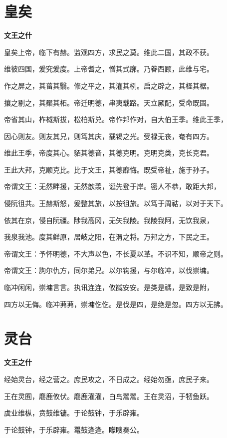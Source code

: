 \documentclass[12pt,a4paper]{ctexbook}
\begin{document}
\section{皇矣}
\textbf{文王之什}\par\vspace{0.5em}
皇矣上帝，临下有赫。监观四方，求民之莫。维此二国，其政不获。\par
维彼四国，爰究爰度。上帝耆之，憎其式廓。乃眷西顾，此维与宅。\par
作之屏之，其菑其翳。修之平之，其灌其栵。启之辟之，其柽其椐。\par
攘之剔之，其檿其柘。帝迁明德，串夷载路。天立厥配，受命既固。\par
帝省其山，柞棫斯拔，松柏斯兑。帝作邦作对，自大伯王季。维此王季，\par
因心则友。则友其兄，则笃其庆，载锡之光。受禄无丧，奄有四方。\par
维此王季，帝度其心。貊其德音，其德克明。克明克类，克长克君。\par
王此大邦，克顺克比。比于文王，其德靡悔。既受帝祉，施于孙子。\par
帝谓文王：无然畔援，无然歆羡，诞先登于岸。密人不恭，敢距大邦，\par
侵阮徂共。王赫斯怒，爰整其旅，以按徂旅。以笃于周祜，以对于天下。\par
依其在京，侵自阮疆。陟我高冈，无矢我陵。我陵我阿，无饮我泉，\par
我泉我池。度其鲜原，居岐之阳，在渭之将。万邦之方，下民之王。\par
帝谓文王：予怀明德，不大声以色，不长夏以革。不识不知，顺帝之则。\par
帝谓文王：訽尔仇方，同尔弟兄。以尔钩援，与尔临冲，以伐崇墉。\par
临冲闲闲，崇墉言言。执讯连连，攸馘安安。是类是禡，是致是附，\par
四方以无侮。临冲茀茀，崇墉仡仡。是伐是四，是绝是忽。四方以无拂。\par

\section{灵台}
\textbf{文王之什}\par\vspace{0.5em}
经始灵台，经之营之。庶民攻之，不日成之。经始勿亟，庶民子来。\par
王在灵囿，麀鹿攸伏。麀鹿濯濯，白鸟翯翯。王在灵沼，于牣鱼跃。\par
虡业维枞，贲鼓维镛。于论鼓钟，于乐辟雍。\par
于论鼓钟，于乐辟雍。鼍鼓逢逢。矇瞍奏公。\par
\end{document}
